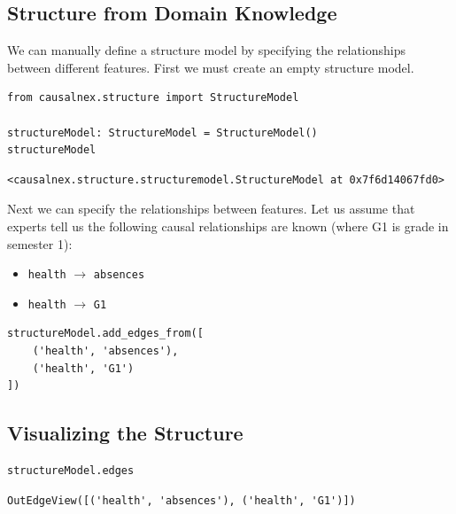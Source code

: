 \documentclass[
]{article}
\providecommand{\tightlist}{%
  \setlength{\itemsep}{0pt}\setlength{\parskip}{0pt}}
\begin{document}
\hypertarget{structure-from-domain-knowledge}{%
\subsection{Structure from Domain
Knowledge}\label{structure-from-domain-knowledge}}

We can manually define a structure model by specifying the relationships
between different features. First we must create an empty structure
model.

\begin{verbatim}
from causalnex.structure import StructureModel

structureModel: StructureModel = StructureModel()
structureModel
\end{verbatim}

\begin{verbatim}
<causalnex.structure.structuremodel.StructureModel at 0x7f6d14067fd0>
\end{verbatim}

Next we can specify the relationships between features. Let us assume
that experts tell us the following causal relationships are known (where
G1 is grade in semester 1):

\begin{itemize}
\tightlist
\item
  \texttt{health} \(\longrightarrow\)
  \texttt{absences}
\item
  \texttt{health} \(\longrightarrow\)
  \texttt{G1}
\end{itemize}

\begin{verbatim}
structureModel.add_edges_from([
    ('health', 'absences'),
    ('health', 'G1')
])
\end{verbatim}

\hypertarget{visualizing-the-structure}{%
\subsection{Visualizing the Structure}\label{visualizing-the-structure}}

\begin{verbatim}
structureModel.edges
\end{verbatim}

\begin{verbatim}
OutEdgeView([('health', 'absences'), ('health', 'G1')])
\end{verbatim}
\end{document}
